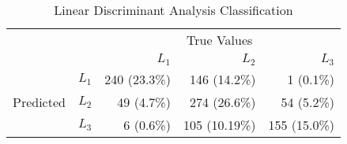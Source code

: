\begin{table}
\centering
  \caption{Linear Discriminant Analysis Classification}
  \begin{tabular}{rrrrr}
    \toprule
    & &\multicolumn{3}{c}{True Values}\\
    & & ${L_1}$ & ${L_2}$ & ${L_3}$ \\
    \multirow{3}{*}{Predicted} & ${L_1}$ & 240 (23.3\%) & 146 (14.2\%) & 1 (0.1\%) \\
    & ${L_2}$ & 49 (4.7\%) & 274 (26.6\%) & 54 (5.2\%) \\
    & ${L_3}$ & 6 (0.6\%) & 105 (10.19\%) & 155 (15.0\%) \\\bottomrule
  \end{tabular}
\end{table}
